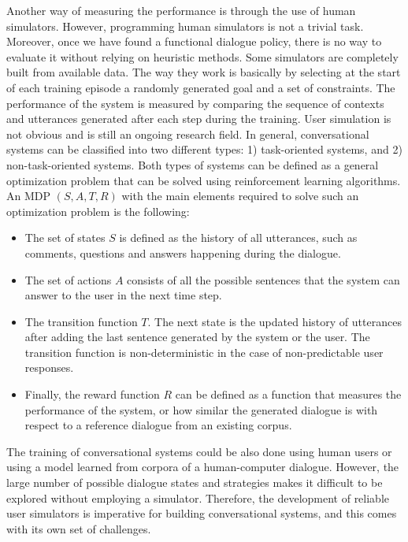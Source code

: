 Another way of measuring the performance is through the use of human simulators. However,  programming human simulators is not a trivial task. Moreover, once we have found a functional dialogue policy, there is no way to evaluate it without relying on heuristic methods. Some simulators are completely built from available data. The way they work is basically by selecting at the start of each training episode a randomly generated goal and a set of constraints. The performance of the system is measured by comparing the sequence of contexts and utterances generated after each step during the training. User simulation is not obvious and is still an ongoing research field. 
In general, conversational systems can be classified into two different types:
1) task-oriented systems, and 2) non-task-oriented systems.
Both types of systems can be defined as a general optimization problem that can be solved using reinforcement learning algorithms. An MDP $(S,A,T,R)$ with the main elements required to solve such an optimization problem is the following:
\begin{itemize}
\item The set of states $S$ is defined as the history of all utterances, such as comments, questions and answers happening during the dialogue. 
\item The set of actions $A$ consists of all the possible sentences that the system can answer to the user in the next time step.
\item The transition function $T$. The next state is the updated history of utterances after adding the last sentence generated by the system or the user. The transition function is non-deterministic in the case of non-predictable user responses.
\item Finally, the reward function $R$ can be defined as a function that measures the performance of the system, or how similar the generated dialogue is with respect to a reference dialogue from an existing corpus.
\end{itemize} 
The training of conversational systems could be also done using human users or using a model learned from corpora of a human-computer dialogue. However, the large number of possible dialogue states and strategies makes it difficult to be explored without employing a simulator. Therefore, the development of reliable user simulators is imperative for building conversational systems, and this comes with its own set of challenges.
